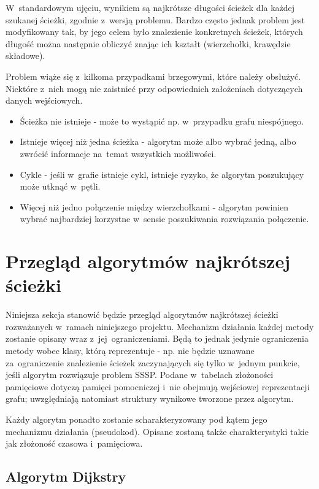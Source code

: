 \documentclass[11pt,a4paper,oneside]{report}
\begin{document}
W~standardowym ujęciu, wynikiem są najkrótsze długości ścieżek dla każdej szukanej ścieżki, zgodnie z~wersją problemu. Bardzo często jednak problem jest modyfikowany tak, by jego celem było znalezienie konkretnych ścieżek, których długość można następnie obliczyć znając ich kształt (wierzchołki, krawędzie składowe).

Problem wiąże się z~kilkoma przypadkami brzegowymi, które należy obsłużyć. Niektóre z~nich mogą nie zaistnieć przy odpowiednich założeniach dotyczących danych wejściowych.
\begin{itemize}
	\item Ścieżka nie istnieje - może to wystąpić np. w~przypadku grafu niespójnego.
	\item Istnieje więcej niż jedna ścieżka - algorytm może albo wybrać jedną, albo zwrócić informacje na~temat wszystkich możliwości.
	\item Cykle - jeśli w~grafie istnieje cykl, istnieje ryzyko, że algorytm poszukujący może utknąć w~pętli.
	\item Więcej niż jedno połączenie między wierzchołkami - algorytm powinien wybrać najbardziej korzystne w~sensie poszukiwania rozwiązania połączenie.
\end{itemize}

\section{Przegląd algorytmów najkrótszej ścieżki}

Niniejsza sekcja stanowić będzie przegląd algorytmów najkrótszej ścieżki rozważanych w~ramach niniejszego projektu. Mechanizm działania każdej metody zostanie opisany wraz z~jej~ograniczeniami. Będą to jednak jedynie ograniczenia metody wobec klasy, którą reprezentuje - np. nie będzie uznawane za~ograniczenie znalezienie ścieżek zaczynających się tylko w~jednym punkcie, jeśli algorytm rozwiązuje problem SSSP. Podane w~tabelach złożoności pamięciowe dotyczą pamięci pomocniczej i~nie obejmują wejściowej reprezentacji grafu; uwzględniają natomiast struktury wynikowe tworzone przez algorytm.

Każdy algorytm ponadto zostanie scharakteryzowany pod kątem jego mechanizmu działania (pseudokod). Opisane zostaną także charakterystyki takie jak złożoność czasowa i~pamięciowa.

\newpage

\subsection{Algorytm Dijkstry}
\end{document}
